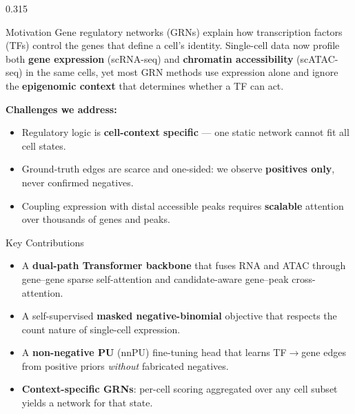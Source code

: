 \documentclass[final,25pt]{beamer}
\newcommand{\keyword}[1]{\textcolor{primary}{\bfseries #1}}
\begin{document}
\begin{frame}[t]
\begin{columns}[t]
\begin{column}{0.315\textwidth}

\begin{card}[primary]{Motivation}
  Gene regulatory networks (GRNs) explain how transcription factors (TFs)
  control the genes that define a cell's identity. Single-cell data now
  profile both \keyword{gene expression} (scRNA-seq) and
  \keyword{chromatin accessibility} (scATAC-seq) in the same cells,
  yet most GRN methods use expression alone and ignore the
  \keyword{epigenomic context} that determines whether a TF can act.

  \vspace{10pt}
  \textbf{Challenges we address:}
  \begin{itemize}\setlength\itemsep{6pt}
    \item Regulatory logic is \keyword{cell-context specific} — one static
          network cannot fit all cell states.
    \item Ground-truth edges are scarce and one-sided: we observe
          \keyword{positives only}, never confirmed negatives.
    \item Coupling expression with distal accessible peaks requires
          \keyword{scalable} attention over thousands of genes and peaks.
  \end{itemize}
\end{card}

\vspace{1.15cm}

\begin{card}[accent]{Key Contributions}
  \begin{itemize}\setlength\itemsep{9pt}
    \item A \keyword{dual-path Transformer backbone} that fuses RNA and ATAC
          through gene--gene sparse self-attention and candidate-aware
          gene--peak cross-attention.
    \item A self-supervised \keyword{masked negative-binomial} objective that
          respects the count nature of single-cell expression.
    \item A \keyword{non-negative PU} (nnPU) fine-tuning head that learns
          TF$\rightarrow$gene edges from positive priors \emph{without}
          fabricated negatives.
    \item \keyword{Context-specific GRNs}: per-cell scoring aggregated over any
          cell subset yields a network for that state.
  \end{itemize}
\end{card}


\end{column}
\end{columns}
\end{frame}
\end{document}

